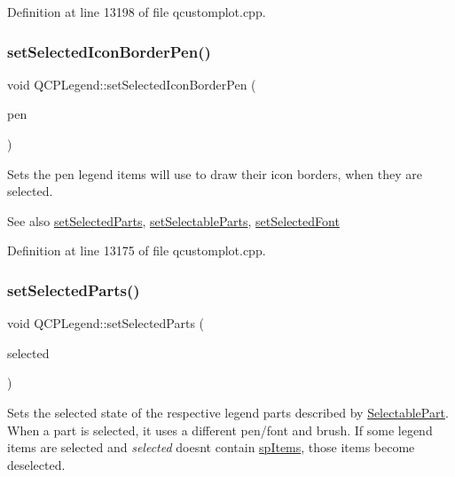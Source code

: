 Definition at line 13198 of file qcustomplot.\+cpp.

\mbox{\label{class_q_c_p_legend_ade93aabe9bcccaf9cf46cec22c658027}} 
\subsubsection{\texorpdfstring{set\+Selected\+Icon\+Border\+Pen()}{setSelectedIconBorderPen()}}
{\footnotesize\ttfamily void Q\+C\+P\+Legend\+::set\+Selected\+Icon\+Border\+Pen (\begin{DoxyParamCaption}\item[{const Q\+Pen \&}]{pen }\end{DoxyParamCaption})}

Sets the pen legend items will use to draw their icon borders, when they are selected.

\begin{DoxySeeAlso}{See also}
\hyperlink{class_q_c_p_legend_a2aee309bb5c2a794b1987f3fc97f8ad8}{set\+Selected\+Parts}, \hyperlink{class_q_c_p_legend_a9ce60aa8bbd89f62ae4fa83ac6c60110}{set\+Selectable\+Parts}, \hyperlink{class_q_c_p_legend_ab580a01c3c0a239374ed66c29edf5ad2}{set\+Selected\+Font} 
\end{DoxySeeAlso}


Definition at line 13175 of file qcustomplot.\+cpp.

\mbox{\label{class_q_c_p_legend_a2aee309bb5c2a794b1987f3fc97f8ad8}} 
\subsubsection{\texorpdfstring{set\+Selected\+Parts()}{setSelectedParts()}}
{\footnotesize\ttfamily void Q\+C\+P\+Legend\+::set\+Selected\+Parts (\begin{DoxyParamCaption}\item[{const Selectable\+Parts \&}]{selected }\end{DoxyParamCaption})}

Sets the selected state of the respective legend parts described by \hyperlink{class_q_c_p_legend_a5404de8bc1e4a994ca4ae69e2c7072f1}{Selectable\+Part}. When a part is selected, it uses a different pen/font and brush. If some legend items are selected and {\itshape selected} doesn\textquotesingle{}t contain \hyperlink{class_q_c_p_legend_a5404de8bc1e4a994ca4ae69e2c7072f1a768bfb95f323db4c66473375032c0af7}{sp\+Items}, those items become deselected.

